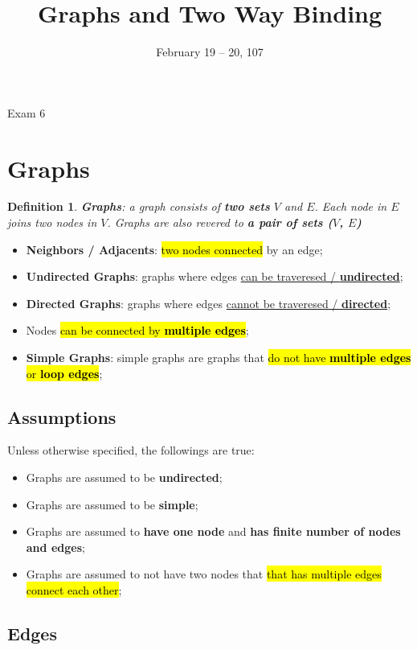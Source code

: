 \documentclass{note}
\date{February 19 -- 20, 107}
\title{Graphs and Two Way Binding}
\newtheorem{definition}{Definition}
\begin{document}
    \begin{note}{Exam 6}

        \section{Graphs}

        \begin{definition}
            \textbf{Graphs}: a graph consists of \textbf{two sets} $ V $ and $ E $. Each node in $ E $ joins two nodes in
            $ V $. Graphs are also revered to \textbf{a pair of sets ($ V $, $ E $)}
        \end{definition}
        \begin{itemize}
            \item \textbf{Neighbors / Adjacents}: \hl{two nodes connected} by an edge;
            \item \textbf{Undirected Graphs}: graphs where edges \underline{can be traveresed / \textbf{undirected}};
            \item \textbf{Directed Graphs}: graphs where edges \underline{cannot be traveresed / \textbf{directed}};
            \item Nodes \hl{can be connected by \textbf{multiple edges}};
            \item \textbf{Simple Graphs}: simple graphs are graphs that \hl{do not have \textbf{multiple edges} or \textbf{loop edges}};
        \end{itemize}

        \subsection{Assumptions}

        Unless otherwise specified, the followings are true:
        \begin{itemize}
            \item Graphs are assumed to be \textbf{undirected};
            \item Graphs are assumed to be \textbf{simple};
            \item Graphs are assumed to \textbf{have one node} and \textbf{has finite number of nodes and edges};
            \item Graphs are assumed to not have two nodes that \hl{that has multiple edges connect each other};
        \end{itemize}

        \subsection{Edges}


\end{note}
\end{document}
